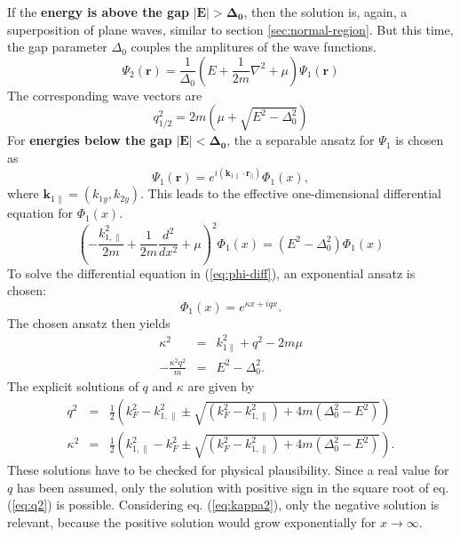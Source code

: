 If the \textbf{energy is above the gap} $\mathbf{ |E| > \Delta_0}$, then the solution is, again, a superposition of plane waves, similar to section \ref{sec:normal-region}. But this time, the gap parameter $\Delta_0$ couples the amplitures of the wave functions.
\begin{equation}
\Psi_2 \left( \mathbf{r} \right)  = \frac{1}{\Delta_0} \left( E + \frac{1}{2m} \nabla^2 + \mu \right) \Psi_1 \left( \mathbf{r}  \right) \label{eq:psi-coupling}
\end{equation}
The corresponding wave vectors are 
\begin{equation}
q_{1/2}^2 = 2m \left( \mu + \sqrt{E^2 - \Delta_0^2} \right)
\end{equation}
\newline
For \textbf{energies below the gap} $\mathbf{ |E| < \Delta_0}$, the a separable ansatz for $\Psi_1$ is chosen as
\begin{equation}
\Psi_1 \left( \mathbf{r} \right)  = e^{i ( \mathbf{k}_{1 \parallel} \cdot \mathbf{r}_{\parallel} ) } \Phi_1\left( x \right),
\end{equation}
where $\mathbf{k}_{1 \parallel} = (k_{1y}, k_{2y})$. This leads to the effective one-dimensional differential equation for $\Phi_1\left( x \right)$.
\begin{equation}
\left( - \frac{k_{1, \parallel}^2}{2m} + \frac{1}{2m} \frac{d^2}{dx^2} + \mu \right)^2 \Phi_1\left( x \right) = (E^2 - \Delta_0^2) \Phi_1\left( x \right) \label{eq:phi-diff}
\end{equation}
To solve the differential equation in (\ref{eq:phi-diff}), an exponential ansatz is chosen:
\begin{equation}
\Phi_1(x) = e^{\kappa x + i q x}.
\end{equation}
The chosen ansatz then yields
\begin{eqnarray}
\kappa^2 &=& k_{1\parallel}^2 + q^2 - 2m\mu \\
- \frac{\kappa^2 q^2}{m} &=& E^2 - \Delta_0^2.
\end{eqnarray}
The explicit solutions of $q$ and $\kappa$ are given by
\begin{eqnarray}
q^2 &=& \frac{1}{2}\left( k_F^2 - k_{1, \parallel}^2 \pm \sqrt{ (k_F^2 - k_{1, \parallel}^2) + 4m(\Delta_0^2 - E^2)} \right) \label{eq:q2}\\
\kappa^2 &=& \frac{1}{2}\left( k_{1, \parallel}^2 - k_F^2 \pm \sqrt{ (k_F^2 - k_{1, \parallel}^2) + 4m(\Delta_0^2 - E^2)} \right)\label{eq:kappa2}.
\end{eqnarray}
These solutions have to be checked for physical plausibility. Since a real value for $q$ has been assumed, only the solution with positive sign in the square root of eq. (\ref{eq:q2}) is possible. Considering eq. (\ref{eq:kappa2}), only the negative solution is relevant, because the positive solution would grow exponentially for $x \rightarrow \infty$.
